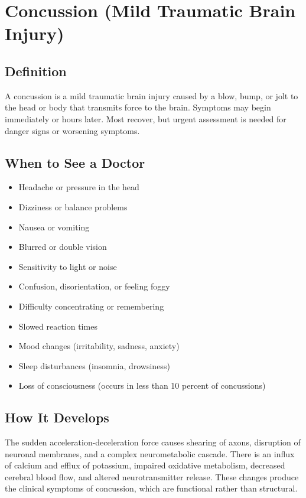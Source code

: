 \chapter{Concussion (Mild Traumatic Brain Injury)}

\section*{Definition}
A concussion is a mild traumatic brain injury caused by a blow, bump, or jolt to the head or body that transmits force to the brain. Symptoms may begin immediately or hours later. Most recover, but urgent assessment is needed for danger signs or worsening symptoms.

\section*{When to See a Doctor}
\begin{itemize}
\item Headache or pressure in the head
\item Dizziness or balance problems
\item Nausea or vomiting
\item Blurred or double vision
\item Sensitivity to light or noise
\item Confusion, disorientation, or feeling foggy
\item Difficulty concentrating or remembering
\item Slowed reaction times
\item Mood changes (irritability, sadness, anxiety)
\item Sleep disturbances (insomnia, drowsiness)
\item Loss of consciousness (occurs in less than 10 percent of concussions)
\end{itemize}

\section*{How It Develops}
The sudden acceleration-deceleration force causes shearing of axons, disruption of neuronal membranes, and a complex neurometabolic cascade. There is an influx of calcium and efflux of potassium, impaired oxidative metabolism, decreased cerebral blood flow, and altered neurotransmitter release. These changes produce the clinical symptoms of concussion, which are functional rather than structural.

